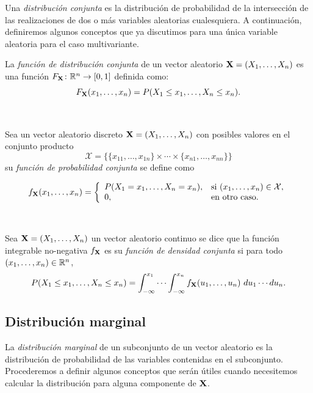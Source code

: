 \documentclass[oneside,openright,titlepage,numbers=noenddot,openany,headinclude,footinclude=true,
cleardoublepage=empty,abstractoff,BCOR=5mm,paper=a4,fontsize=12pt,main=spanish]{scrreprt}
\begin{document}
Una \textit{distribución conjunta} es la distribución de probabilidad de la intersección de las realizaciones de dos o más variables aleatorias cualesquiera. A continuación, definiremos algunos conceptos que ya discutimos para una única variable aleatoria para el caso multivariante.\\

\begin{definition}
La \textit{función de distribución conjunta} de un vector aleatorio $\textbf{X}=(X_1,\dots,X_n)$ es una función $F_{\textbf{X}}\colon \mathbb{R}^n \to [0,1]$ definida como: $$F_{\textbf{X}}(x_1,\dots,x_n)=P(X_1\leq x_1,\dots,X_n\leq x_n).$$
\end{definition}\

\begin{definition}
Sea un vector aleatorio discreto $\textbf{X}=(X_1,\dots,X_n)$ con posibles valores en el conjunto producto $$\mathcal{X}=\Big\lbrace \{x_{11},\dots,x_{1n}\}\times \cdots \times \{x_{n1},\dots,x_{nn}\} \Big\rbrace$$ su \textit{función de probabilidad conjunta} se define como

$$f_{\textbf{X}}(x_1,\dots,x_n)= \left \{
\begin{array}{l l}
P(X_1=x_1,\dots,X_n=x_n), & \mbox{si } (x_1,\dots,x_n)\in \mathcal{X}, \\
0, & \mbox{en otro caso}.
\end{array}
\right.$$
\end{definition}\

\begin{definition}
Sea $\textbf{X}=(X_1,\dots,X_n)$ un vector aleatorio continuo se dice que la función integrable no-negativa $f_{\textbf{X}}$ es su \textit{función de densidad conjunta} si para todo $(x_1,\dots,x_n) \in \mathbb{R}^n$, $$P(X_1\leq x_1,\dots, X_n \leq x_n)=\int_{-\infty}^{x_1} \cdots \int_{-\infty}^{x_n} f_{\textbf{X}}(u_1,\dots,u_n) \ du_1 \cdots du_n.$$ 
\end{definition}

\subsection{Distribución marginal}

La \textit{distribución marginal} de un subconjunto de un vector aleatorio es la distribución de probabilidad de las variables contenidas en el subconjunto. Procederemos a definir algunos conceptos que serán útiles cuando necesitemos calcular la distribución para alguna componente de $\textbf{X}$.\\
\end{document}
